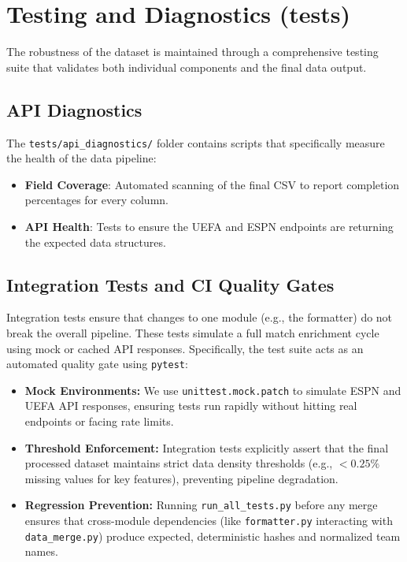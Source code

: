 \documentclass[12pt,a4paper]{article}
\begin{document}
\section{Testing and Diagnostics (tests)}
The robustness of the dataset is maintained through a comprehensive testing suite that validates both individual components and the final data output.

\subsection{API Diagnostics}
The \texttt{tests/api\_diagnostics/} folder contains scripts that specifically measure the health of the data pipeline:
\begin{itemize}
    \item \textbf{Field Coverage}: Automated scanning of the final CSV to report completion percentages for every column.
    \item \textbf{API Health}: Tests to ensure the UEFA and ESPN endpoints are returning the expected data structures.
\end{itemize}

\subsection{Integration Tests and CI Quality Gates}
Integration tests ensure that changes to one module (e.g., the formatter) do not break the overall pipeline. These tests simulate a full match enrichment cycle using mock or cached API responses. Specifically, the test suite acts as an automated quality gate using \texttt{pytest}:
\begin{itemize}
    \item \textbf{Mock Environments:} We use \texttt{unittest.mock.patch} to simulate ESPN and UEFA API responses, ensuring tests run rapidly without hitting real endpoints or facing rate limits.
    \item \textbf{Threshold Enforcement:} Integration tests explicitly assert that the final processed dataset maintains strict data density thresholds (e.g., $<0.25\%$ missing values for key features), preventing pipeline degradation.
    \item \textbf{Regression Prevention:} Running \texttt{run\_all\_tests.py} before any merge ensures that cross-module dependencies (like \texttt{formatter.py} interacting with \texttt{data\_merge.py}) produce expected, deterministic hashes and normalized team names.
\end{itemize}
\end{document}
